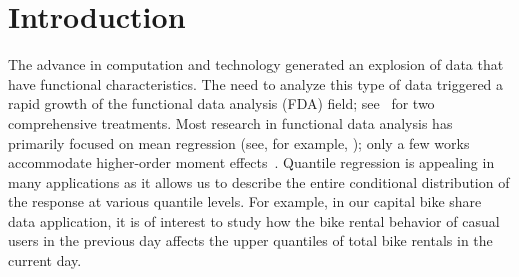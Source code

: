 \documentclass[times,sort&compress,3p]{elsarticle}
\theoremstyle{plain}%
\theoremstyle{definition}
\begin{document}
\section{Introduction}
\label{sec:introduction} 
The advance in computation and technology generated an explosion of data that have functional characteristics. The need to analyze this type of data triggered a rapid growth of the functional data analysis (FDA) field; see~\cite{Ramsay+Silverman:05, Ferraty+Vieu:06} for two comprehensive treatments. Most research in functional data analysis has primarily focused on mean regression (see, for example, \cite{Yao+a:05,Jiang+Wang:10,Ger+:13,Iva+:15,Usset+:16}); only a few works accommodate higher-order moment effects~\citep{Staicu+:11,Li+Staicu+Bondell:15}. Quantile regression is appealing in many applications as it allows us to describe the entire conditional distribution of the response at various quantile levels. For example, in our capital bike share data application, it is of interest to study how the bike rental behavior of casual users in the previous day affects the upper quantiles of total bike rentals in the current day.
\end{document}
